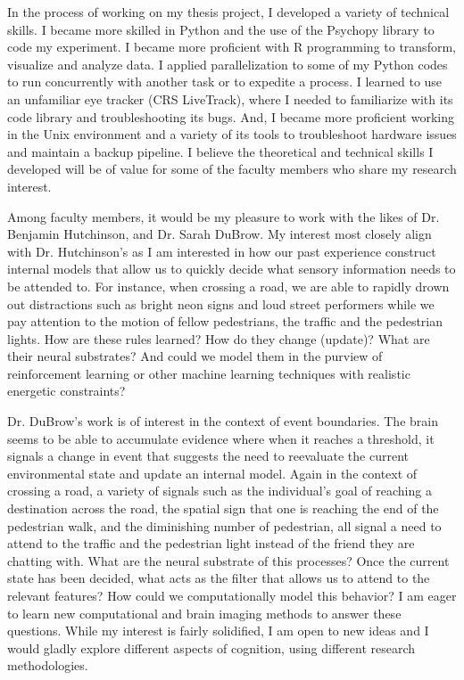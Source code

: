 \documentclass[12pt]{article}
\begin{document}
	In the process of working on my thesis project, I developed a variety of technical skills. I became more skilled in Python and the use of the Psychopy library to code my experiment. I became more proficient with R programming to transform, visualize and analyze data. I applied parallelization to some of my Python codes to run concurrently with another task or to expedite a process. I learned to use an unfamiliar eye tracker (CRS LiveTrack), where I needed to familiarize with its code library and troubleshooting its bugs. And, I became more proficient working in the Unix environment and a variety of its tools to troubleshoot hardware issues and maintain a backup pipeline. I believe the theoretical and technical skills I developed will be of value for some of the faculty members who share my research interest.
	
	Among faculty members, it would be my pleasure to work with the likes of Dr. Benjamin Hutchinson, and Dr. Sarah DuBrow. My interest most closely align with Dr.  Hutchinson’s as I am interested in how our past experience construct internal models that allow us to quickly decide what sensory information needs to be attended to. For instance, when crossing a road, we are able to rapidly drown out distractions such as bright neon signs and loud street performers while we pay attention to the motion of fellow pedestrians, the traffic and the pedestrian lights. How are these rules learned? How do they change (update)? What are their neural substrates? And could we model them in the purview of reinforcement learning or other machine learning techniques with realistic energetic constraints?
	
	Dr. DuBrow’s work is of interest in the context of event boundaries. The brain seems to be able to accumulate evidence where when it reaches a threshold, it signals a change in event that suggests the need to reevaluate the current environmental state and update an internal model. Again in the context of crossing a road, a variety of signals such as the individual’s goal of reaching a destination across the road, the spatial sign that one is reaching the end of the pedestrian walk, and the diminishing number of pedestrian, all signal a need to attend to the traffic and the pedestrian light instead of the friend they are chatting with. What are the neural substrate of this processes? Once the current state has been decided, what acts as the filter that allows us to attend to the relevant features? How could we computationally model this behavior? I am eager to learn new computational and brain imaging methods to answer these questions. While my interest is fairly solidified, I am open to new ideas and I would gladly explore different aspects of cognition, using different research methodologies.
	
\end{document}
